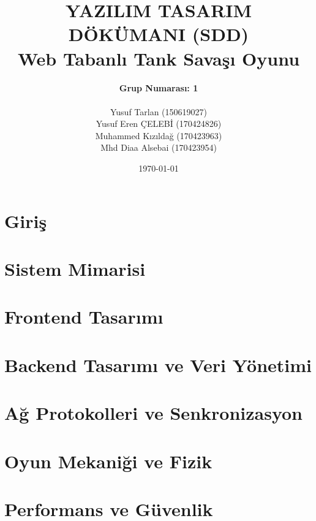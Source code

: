 \documentclass[12pt,a4paper]{article}
\title{
    \vspace{2in}
    \textbf{\Huge YAZILIM TASARIM DÖKÜMANI (SDD)} \\
    \vspace{0.5in}
    \textbf{\Large Web Tabanlı Tank Savaşı Oyunu} \\
    \vspace{1in}
}
\author{
    \textbf{Grup Numarası: 1} \\ \\
    Yusuf Tarlan (150619027) \\ 
    Yusuf Eren ÇELEBİ (170424826) \\ 
    Muhammed Kızıldağ (170423963) \\ 
    Mhd Diaa Alsebai (170423954)
}
\date{\vfill \today}
\begin{document}
\maketitle
\thispagestyle{empty} %
\newpage

\tableofcontents
\newpage


\section{Giriş}
\section{Sistem Mimarisi}
\section{Frontend Tasarımı}
\section{Backend Tasarımı ve Veri Yönetimi}
\section{Ağ Protokolleri ve Senkronizasyon}
\section{Oyun Mekaniği ve Fizik}
\section{Performans ve Güvenlik}
\end{document}
